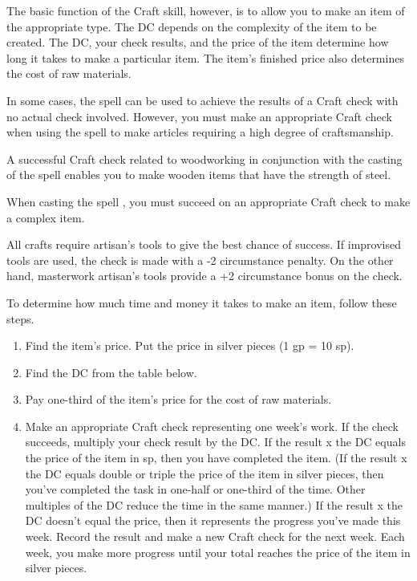 The basic function of the Craft skill, however, is to allow you to make an item of the appropriate type. The DC depends on the complexity of the item to be created. The DC, your check results, and the price of the item determine how long it takes to make a particular item. The item's finished price also determines the cost of raw materials.

In some cases, the  spell can be used to achieve the results of a Craft check with no actual check involved. However, you must make an appropriate Craft check when using the spell to make articles requiring a high degree of craftsmanship.

A successful Craft check related to woodworking in conjunction with the casting of the  spell enables you to make wooden items that have the strength of steel.

When casting the spell , you must succeed on an appropriate Craft check to make a complex item.

All crafts require artisan's tools to give the best chance of success. If improvised tools are used, the check is made with a -2 circumstance penalty. On the other hand, masterwork artisan's tools provide a +2 circumstance bonus on the check.

To determine how much time and money it takes to make an item, follow these steps.

\begin{enumerate}
	\item Find the item's price. Put the price in silver pieces (1 gp = 10 sp).
	\item Find the DC from the table below.
	\item Pay one-third of the item's price for the cost of raw materials.
	\item Make an appropriate Craft check representing one week's work. If the check succeeds, multiply your check result by the DC. If the result x the DC equals the price of the item in sp, then you have completed the item. (If the result x the DC equals double or triple the price of the item in silver pieces, then you've completed the task in one-half or one-third of the time. Other multiples of the DC reduce the time in the same manner.) If the result x the DC doesn't equal the price, then it represents the progress you've made this week. Record the result and make a new Craft check for the next week. Each week, you make more progress until your total reaches the price of the item in silver pieces.
\end{enumerate}

